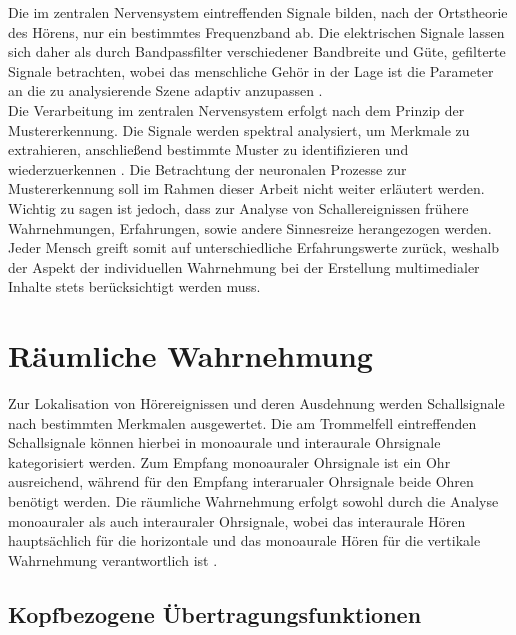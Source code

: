Die im zentralen Nervensystem eintreffenden Signale bilden, nach der Ortstheorie des Hörens, nur ein bestimmtes Frequenzband ab. Die elektrischen Signale lassen sich daher als durch Bandpassfilter verschiedener Bandbreite und Güte,  gefilterte Signale betrachten, wobei das menschliche Gehör in der Lage ist die Parameter an die zu analysierende Szene adaptiv anzupassen \cite[S.59]{Genuit10}. \\

Die Verarbeitung im zentralen Nervensystem erfolgt nach dem Prinzip der Mustererkennung. Die Signale werden spektral analysiert, um Merkmale zu extrahieren, anschließend bestimmte Muster zu identifizieren und wiederzuerkennen \cite[S.51]{HdA08}. Die Betrachtung der neuronalen Prozesse zur Mustererkennung soll im Rahmen dieser Arbeit nicht weiter erläutert werden. Wichtig zu sagen ist jedoch, dass  zur Analyse von Schallereignissen frühere Wahrnehmungen, Erfahrungen, sowie andere Sinnesreize herangezogen werden. Jeder Mensch greift somit auf unterschiedliche Erfahrungswerte zurück, weshalb der Aspekt der individuellen Wahrnehmung bei der Erstellung multimedialer Inhalte stets berücksichtigt werden muss. 

\section{Räumliche Wahrnehmung}
Zur Lokalisation von Hörereignissen und deren Ausdehnung werden Schallsignale nach bestimmten Merkmalen ausgewertet. Die am Trommelfell eintreffenden Schallsignale können hierbei in monoaurale und interaurale Ohrsignale kategorisiert werden. Zum Empfang monoauraler Ohrsignale ist ein Ohr ausreichend, während für den Empfang interarualer Ohrsignale beide Ohren benötigt werden. Die räumliche Wahrnehmung erfolgt sowohl durch die Analyse monoauraler als auch interauraler Ohrsignale, wobei das interaurale Hören hauptsächlich für die horizontale und das monoaurale Hören für die vertikale Wahrnehmung verantwortlich ist \cite[S.88]{HdA08}.\\

\subsection{Kopfbezogene Übertragungsfunktionen}

